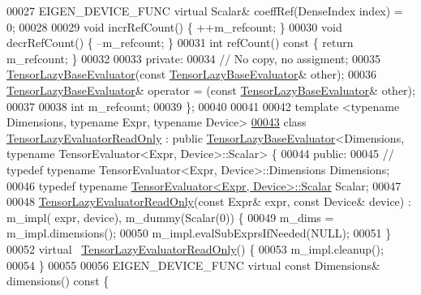 \begin{DoxyCode}
00027   EIGEN\_DEVICE\_FUNC \textcolor{keyword}{virtual} Scalar& coeffRef(DenseIndex index) = 0;
00028 
00029   \textcolor{keywordtype}{void} incrRefCount() \{ ++m\_refcount; \}
00030   \textcolor{keywordtype}{void} decrRefCount() \{ --m\_refcount; \}
00031   \textcolor{keywordtype}{int} refCount()\textcolor{keyword}{ const }\{ \textcolor{keywordflow}{return} m\_refcount; \}
00032 
00033  \textcolor{keyword}{private}:
00034   \textcolor{comment}{// No copy, no assigment;}
00035   \hyperlink{class_eigen_1_1internal_1_1_tensor_lazy_base_evaluator}{TensorLazyBaseEvaluator}(\textcolor{keyword}{const} \hyperlink{class_eigen_1_1internal_1_1_tensor_lazy_base_evaluator}{TensorLazyBaseEvaluator}& 
      other);
00036   \hyperlink{class_eigen_1_1internal_1_1_tensor_lazy_base_evaluator}{TensorLazyBaseEvaluator}& operator = (\textcolor{keyword}{const} 
      \hyperlink{class_eigen_1_1internal_1_1_tensor_lazy_base_evaluator}{TensorLazyBaseEvaluator}& other);
00037 
00038   \textcolor{keywordtype}{int} m\_refcount;
00039 \};
00040 
00041 
00042 \textcolor{keyword}{template} <\textcolor{keyword}{typename} Dimensions, \textcolor{keyword}{typename} Expr, \textcolor{keyword}{typename} Device>
\hyperlink{class_eigen_1_1internal_1_1_tensor_lazy_evaluator_read_only}{00043} \textcolor{keyword}{class }\hyperlink{class_eigen_1_1internal_1_1_tensor_lazy_evaluator_read_only}{TensorLazyEvaluatorReadOnly} : \textcolor{keyword}{public} 
      \hyperlink{class_eigen_1_1internal_1_1_tensor_lazy_base_evaluator}{TensorLazyBaseEvaluator}<Dimensions, typename TensorEvaluator<Expr, Device>::Scalar>
       \{
00044  \textcolor{keyword}{public}:
00045   \textcolor{comment}{//  typedef typename TensorEvaluator<Expr, Device>::Dimensions Dimensions;}
00046   \textcolor{keyword}{typedef} \textcolor{keyword}{typename} \hyperlink{struct_eigen_1_1_tensor_evaluator}{TensorEvaluator<Expr, Device>::Scalar} Scalar;
00047 
00048   \hyperlink{class_eigen_1_1internal_1_1_tensor_lazy_evaluator_read_only}{TensorLazyEvaluatorReadOnly}(\textcolor{keyword}{const} Expr& expr, \textcolor{keyword}{const} Device& device) : m\_impl(
      expr, device), m\_dummy(Scalar(0)) \{
00049     m\_dims = m\_impl.dimensions();
00050     m\_impl.evalSubExprsIfNeeded(NULL);
00051   \}
00052   \textcolor{keyword}{virtual} ~\hyperlink{class_eigen_1_1internal_1_1_tensor_lazy_evaluator_read_only}{TensorLazyEvaluatorReadOnly}() \{
00053     m\_impl.cleanup();
00054   \}
00055 
00056   EIGEN\_DEVICE\_FUNC \textcolor{keyword}{virtual} \textcolor{keyword}{const} Dimensions& dimensions()\textcolor{keyword}{ const }\{

\end{DoxyCode}
